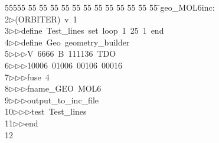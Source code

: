 %
%
\begin{tabbing}
55555 \= 55 \= 55 \= 55 \= 55 \= 55 \= 55 \= 55 \= 55 \= 55 \= 55 \= 55 \= 55 \= \>geo\_MOL6inc:\\[0pt]
2\>$\triangleright$\>(ORBITER)\ v\ 1\ \\[0pt]
3\>$\triangleright$\>$\triangleright$\>define\ Test\_lines\ set\ loop\ 1\ 25\ 1\ end\ \\[0pt]
4\>$\triangleright$\>$\triangleright$\>define\ Geo\ geometry\_builder\ \\[0pt]
5\>$\triangleright$\>$\triangleright$\>$\triangleright$\>V\ 6666\ B\ 111136\ TDO\ \\[0pt]
6\>$\triangleright$\>$\triangleright$\>$\triangleright$\>10006\ 01006\ 00106\ 00016\ \\[0pt]
7\>$\triangleright$\>$\triangleright$\>$\triangleright$\>fuse\ 4\ \\[0pt]
8\>$\triangleright$\>$\triangleright$\>$\triangleright$\>fname\_GEO\ MOL6\ \\[0pt]
9\>$\triangleright$\>$\triangleright$\>$\triangleright$\>output\_to\_inc\_file\ \\[0pt]
10\>$\triangleright$\>$\triangleright$\>$\triangleright$\>test\ Test\_lines\ \\[0pt]
11\>$\triangleright$\>$\triangleright$\>end\\[0pt]
12\>\end{tabbing}
